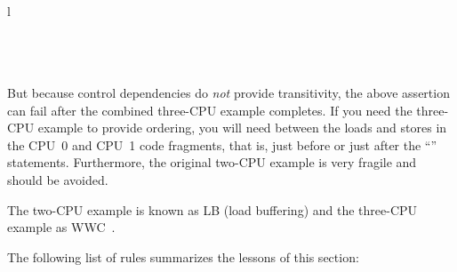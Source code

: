 \vspace{5pt}
\begin{minipage}[t]{\columnwidth}
\tt
\scriptsize
\begin{tabular}{l}
	 \\
	\hline
	 \\
	 \\
	 \\
\end{tabular}
\end{minipage}
\vspace{5pt}

But because control dependencies do \emph{not} provide transitivity, the above
assertion can fail after the combined three-CPU example completes.
If you need the three-CPU example to provide ordering, you will need
 between the loads and stores in the CPU~0 and CPU~1 code
fragments, that is, just before or just after the ``'' statements.
Furthermore, the original two-CPU example is very fragile and should be avoided.

The two-CPU example is known as LB (load buffering) and the three-CPU
example as WWC~\cite{Maranget2012TutorialARMPower}.

The following list of rules summarizes the lessons of this section:

